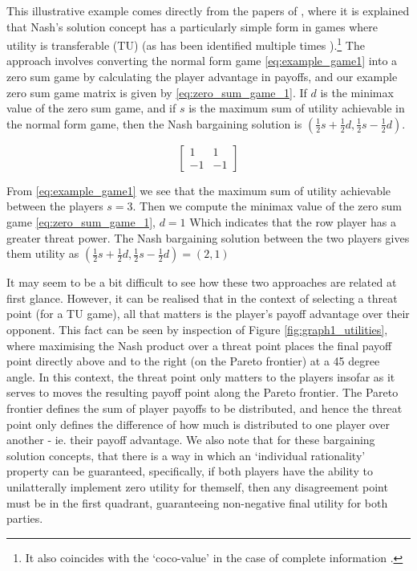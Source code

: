 

This illustrative example comes directly from the papers of \cite{value2,value1}, where it is explained that Nash's solution concept has a particularly simple form in games where utility is transferable (TU) (as has been identified multiple times \cite{value2,shap_lectures,value1}).\footnote{It also coincides with the `coco-value' in the case of complete information \citep{kalai1,Kalai2010}.}
The approach involves converting the normal form game \eqref{eq:example_game1} into a zero sum game by calculating the player advantage in payoffs, and our example zero sum game matrix is given by \eqref{eq:zero_sum_game_1}.
If $d$ is the minimax value of the zero sum game, and if $s$ is the maximum sum of utility achievable in the normal form game, then the Nash bargaining solution is $(\frac{1}{2}s+\frac{1}{2}d,\frac{1}{2}s-\frac{1}{2}d)$.

\begin{equation}\label{eq:zero_sum_game_1} \begin{bmatrix}1 & 1\\ -1 & -1\end{bmatrix} \end{equation}

\begin{solution}[TU approach]
From \eqref{eq:example_game1} we see that the maximum sum of utility achievable between the players $s=3$. Then we compute the minimax value of the zero sum game \eqref{eq:zero_sum_game_1}, $d=1$ Which indicates that the row player has a greater threat power.
The Nash bargaining solution between the two players gives them utility as $(\frac{1}{2}s+\frac{1}{2}d,\frac{1}{2}s-\frac{1}{2}d) = (2,1)$
\end{solution}

It may seem to be a bit difficult to see how these two approaches are related at first glance.
However, it can be realised that in the context of selecting a threat point (for a TU game), all that matters is the player's payoff advantage over their opponent.
This fact can be seen by inspection of Figure \ref{fig:graph1_utilities}, where maximising the Nash product over a threat point places the final payoff point directly above and to the right (on the Pareto frontier) at a 45 degree angle.
In this context, the threat point only matters to the players insofar as it serves to moves the resulting payoff point along the Pareto frontier.
The Pareto frontier defines the sum of player payoffs to be distributed, and hence the threat point only defines the difference of how much is distributed to one player over another - ie. their payoff advantage. We also note that for these bargaining solution concepts, that there is a way in which an `individual rationality' property can be guaranteed, specifically, if both players have the ability to unilatterally implement zero utility for themself, then any disagreement point must be in the first quadrant, guaranteeing non-negative final utility for both parties.

